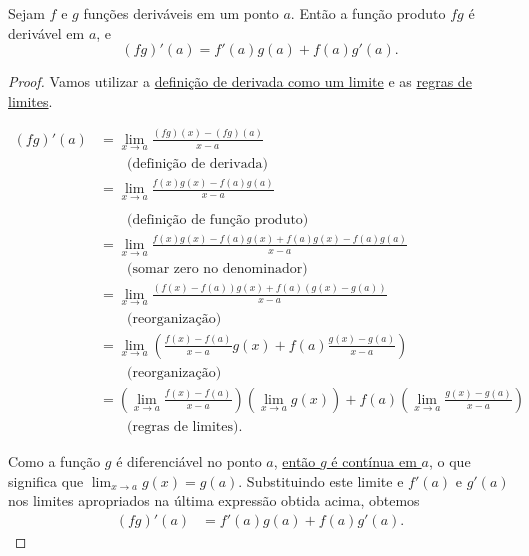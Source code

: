 \begin{theorem}
	Sejam $f$ e $g$ funções deriváveis em um ponto $a$. Então a função produto $fg$ é derivável em $a$, e
	\[(fg)'(a)=f'(a)g(a)+f(a)g'(a).\]
\end{theorem}

\begin{proof}
	Vamos utilizar a \href{../09.derivadas/con_der_em_pt_moodle.html}{definição de derivada como um limite} e as \href{../02.limites_elementares/teo_regras_lim_moodle.html}{regras de limites}.
	
	\begin{align*}
		(fg)'(a)
			&=\lim_{x\to a}\frac{(fg)(x)-(fg)(a)}{x-a}\\
			&\qquad\text{(definição de derivada)}\\
			&=\lim_{x\to a}\frac{f(x)g(x)-f(a)g(a)}{x-a}\\\\
			&\qquad\text{(definição de função produto)}\\
			&=\lim_{x\to a}\frac{f(x)g(x)-f(a)g(x)+f(a)g(x)-f(a)g(a)}{x-a}\\
			&\qquad\text{(somar zero no denominador)}\\
			&=\lim_{x\to a}\frac{\left(f(x)-f(a)\right)g(x)+f(a)\left(g(x)-g(a)\right)}{x-a}\\
			&\qquad\text{(reorganização)}\\
			&=\lim_{x\to a}\left(\frac{f(x)-f(a)}{x-a}g(x)+f(a)\frac{g(x)-g(a)}{x-a}\right)\\
			&\qquad\text{(reorganização)}\\
			&=\left(\lim_{x\to a}\frac{f(x)-f(a)}{x-a}\right)\left(\lim_{x\to a}g(x)\right)+f(a)\left(\lim_{x\to a}\frac{g(x)-g(a)}{x-a}\right)\\
			&\qquad\text{(regras de limites)}.
	\end{align*}
	
	Como a função $g$ é diferenciável no ponto $a$, \href{../09.derivadas/teo_funcoes_derivaveis_sao_continuas_moodle.html}{então $g$ é contínua em $a$}, o que significa que $\lim_{x\to a}g(x)=g(a)$. Substituindo este limite e $f'(a)$ e $g'(a)$ nos limites apropriados na última expressão obtida acima, obtemos
	\begin{align*}
		(fg)'(a)&=f'(a)g(a)+f(a)g'(a).
	\end{align*}
\end{proof}